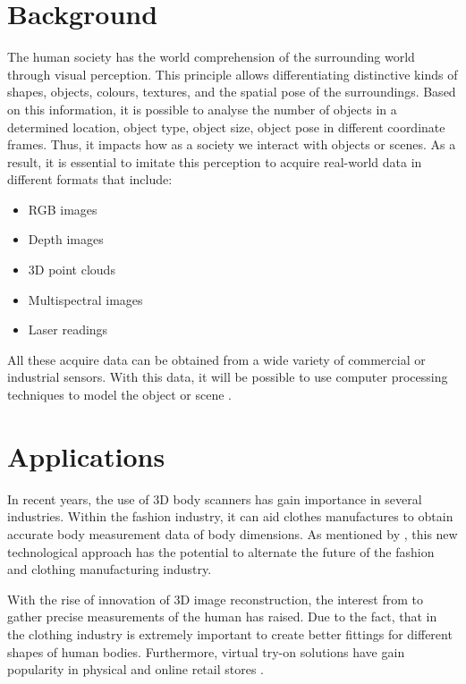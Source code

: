\documentclass[12pt]{report}
\begin{document}
\enlargethispage{\baselineskip}

\section{Background}
The human society has the world comprehension of the surrounding world through visual perception. This principle allows differentiating distinctive kinds of shapes, objects, colours, textures, and the spatial pose of the surroundings.
Based on this information, it is possible to analyse the number of objects in a determined location, object type, object size, object pose in different coordinate frames. 
Thus, it impacts how as a society we interact with objects or scenes. As a result, it is essential to imitate this perception  to acquire real-world data in different formats that include:
\begin{itemize}[]
    \item RGB images
     \item Depth images
     \item 3D point clouds 
     \item Multispectral images
     \item Laser readings
\end{itemize}
All these acquire data can be obtained from a wide variety of commercial or industrial sensors. With this data, it will be possible to use computer processing techniques  to model the object or scene \citep*{murcia_monroy_mora_2018}.

\section{Applications}
In recent years, the use of 3D body scanners has gain importance in several industries. Within the fashion industry, it can aid clothes manufactures to obtain accurate body measurement data of body dimensions.
As mentioned by \citet*{sturm_bylow_kahl_cremers_2013}, this new technological approach has the potential to alternate the future of the fashion and clothing manufacturing industry.

With the rise of innovation of 3D image reconstruction, the interest from to gather precise measurements of the human has raised. Due to the fact, that in the clothing industry
is extremely important to create better fittings for different shapes of human bodies. 
Furthermore, virtual try-on solutions have gain popularity in physical and online retail stores .
\end{document}
